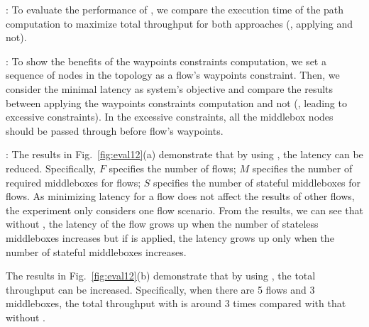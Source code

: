 : To evaluate the performance of \concept{}, we compare the execution time of the path computation to maximize total throughput for both approaches (\ie, applying \concept{} and not).

: To show the benefits of the waypoints constraints computation, we set a sequence of nodes in the topology as a flow's waypoints constraint. Then, we consider the minimal latency as system's objective and compare the results between applying the waypoints constraints computation and not (\ie, leading to excessive constraints). In the excessive constraints, all the middlebox nodes should be passed through before flow's waypoints.



: The results in Fig.~\ref{fig:eval12}(a) demonstrate that by using \concept{}, the latency can be reduced. Specifically, $F$ specifies the number of flows; $M$ specifies the number of required middleboxes for flows; $S$ specifies the number of stateful middleboxes for flows. As minimizing latency for a flow does not affect the results of other flows, the experiment only considers one flow scenario. From the results, we can see that without \concept{}, the latency of the flow grows up when the number of stateless middleboxes increases but if \concept{} is applied, the latency grows up only when the number of stateful middleboxes increases.

The results in Fig.~\ref{fig:eval12}(b) demonstrate that by using \concept{}, the total throughput can be increased. Specifically, when there are 5 flows and 3 middleboxes, the total throughput with \concept{} is around 3 times compared with that without \concept{}.


